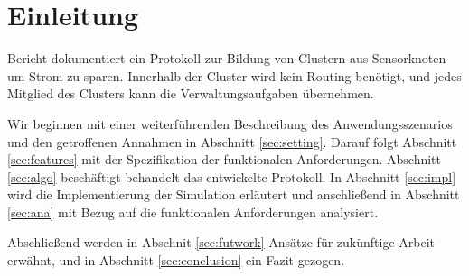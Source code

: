 \section{Einleitung} \label{sec:intro}
 Bericht dokumentiert ein Protokoll zur Bildung von Clustern aus Sensorknoten um Strom zu sparen. Innerhalb der Cluster wird kein Routing ben\"otigt, und jedes Mitglied des Clusters kann die Verwaltungsaufgaben \"ubernehmen.

Wir beginnen mit einer weiterf\"uhrenden Beschreibung des Anwendungsszenarios und den getroffenen Annahmen in Abschnitt \ref{sec:setting}.
Darauf folgt Abschnitt \ref{sec:features} mit der Spezifikation der funktionalen Anforderungen.
Abschnitt \ref{sec:algo} besch\"aftigt behandelt das entwickelte Protokoll.
In Abschnitt \ref{sec:impl} wird die Implementierung der Simulation erläutert und anschließend in Abschnitt \ref{sec:ana} mit Bezug auf die funktionalen Anforderungen analysiert.


Abschließend werden in Abschnit \ref{sec:futwork} Ans\"atze f\"ur zuk\"unftige Arbeit erw\"ahnt, und in Abschnitt \ref{sec:conclusion} ein Fazit gezogen.
